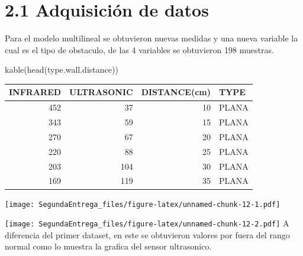 \documentclass[
]{article}
\newenvironment{Shaded}{\begin{snugshade}}{\end{snugshade}}
\newcommand{\AttributeTok}[1]{\textcolor[rgb]{0.77,0.63,0.00}{#1}}
\newcommand{\DecValTok}[1]{\textcolor[rgb]{0.00,0.00,0.81}{#1}}
\newcommand{\FunctionTok}[1]{\textcolor[rgb]{0.00,0.00,0.00}{#1}}
\newcommand{\NormalTok}[1]{#1}
\newcommand{\SpecialCharTok}[1]{\textcolor[rgb]{0.00,0.00,0.00}{#1}}
\begin{document}
\hypertarget{adquisiciuxf3n-de-datos}{%
\section{2.1 Adquisición de datos}\label{adquisiciuxf3n-de-datos}}

Para el modelo multilineal se obtuvieron nuevas medidas y una nueva
variable la cual es el tipo de obstaculo, de las 4 variables se
obtuvieron 198 muestras.

\begin{Shaded}
\begin{Highlighting}[]
\FunctionTok{kable}\NormalTok{(}\FunctionTok{head}\NormalTok{(type.wall.distance))}
\end{Highlighting}
\end{Shaded}

\begin{longtable}[]{@{}rrrl@{}}
\toprule()
INFRARED & ULTRASONIC & DISTANCE(cm) & TYPE \\
\midrule()
\endhead
452 & 37 & 10 & PLANA \\
343 & 59 & 15 & PLANA \\
270 & 67 & 20 & PLANA \\
220 & 88 & 25 & PLANA \\
203 & 104 & 30 & PLANA \\
169 & 119 & 35 & PLANA \\
\bottomrule()
\end{longtable}

\begin{Shaded}
\end{Shaded}

\texttt{[image: SegundaEntrega\_files/figure-latex/unnamed-chunk-12-1.pdf]}

\begin{Shaded}
\end{Shaded}

\texttt{[image: SegundaEntrega\_files/figure-latex/unnamed-chunk-12-2.pdf]}
A diferencia del primer dataset, en este se obtuvieron valores por fuera
del rango normal como lo muestra la grafica del sensor ultrasonico.
\end{document}
